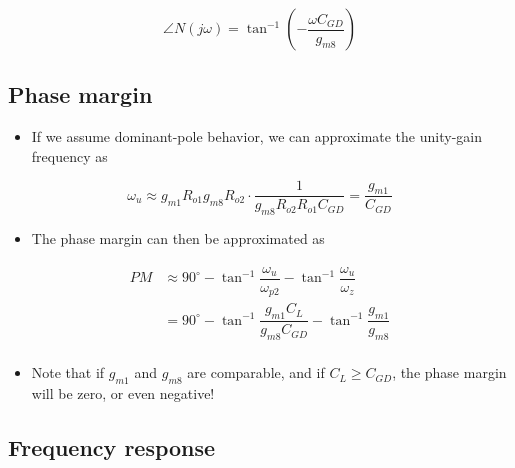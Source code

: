 \documentclass[11pt]{article}
\providecommand{\tightlist}{%
      \setlength{\itemsep}{0pt}\setlength{\parskip}{0pt}}
\begin{document}
\begin{equation}
\angle N(j\omega) = \tan^{-1}\left(-\dfrac{\omega C_{GD}}{g_{m8}}\right)
\end{equation}

    \hypertarget{phase-margin}{%
\subsection{Phase margin}\label{phase-margin}}

    \begin{itemize}
\tightlist
\item
  If we assume dominant-pole behavior, we can approximate the unity-gain
  frequency as
\end{itemize}

\begin{equation}
\omega_u \approx g_{m1}R_{o1}g_{m8}R_{o2} \cdot \dfrac{1}{g_{m8}R_{o2}R_{o1}C_{GD}} = \dfrac{g_{m1}}{C_{GD}}
\end{equation}

\begin{itemize}
\tightlist
\item
  The phase margin can then be approximated as
\end{itemize}

\begin{align}
PM &\approx 90^{\circ} - \tan^{-1}\dfrac{\omega_u}{\omega_{p2}} - \tan^{-1}\dfrac{\omega_u}{\omega_{z}} \\
&= \boxed{90^{\circ} - \tan^{-1}\dfrac{g_{m1}C_L}{g_{m8}C_{GD}} - \tan^{-1}\dfrac{g_{m1}}{g_{m8}}}\\
\end{align}

\begin{itemize}
\tightlist
\item
  Note that if \(g_{m1}\) and \(g_{m8}\) are comparable, and if
  \(C_L \geq C_{GD}\), the phase margin will be zero, or even negative!
\end{itemize}

    \hypertarget{frequency-response}{%
\subsection{Frequency response}\label{frequency-response}}
\end{document}
